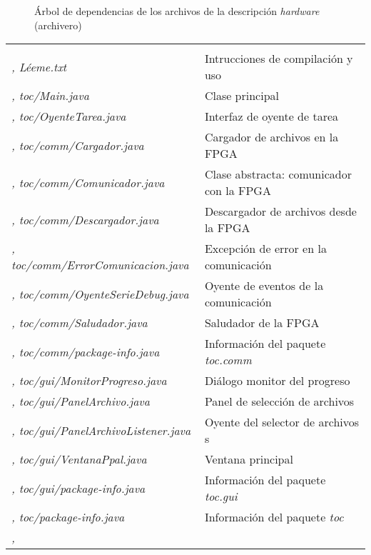 \documentclass{article}
\begin{document}
\begin{figure}[ht] \centering
{}
\caption{Árbol de dependencias de los archivos de la descripción {\itshape hardware} (archivero)}
\end{figure}

\begin{tabu}{| >{\itshape}X[3, l] | X[5, l] |}
	 \\ \sep
	Léeme.txt & Intrucciones de compilación y uso \\ \sep
	toc/Main.java & Clase principal \\ \sep
	toc/OyenteTarea.java & Interfaz de oyente de tarea \\ \sep
	toc/comm/Cargador.java & Cargador de archivos en la FPGA \\ \sep
	toc/comm/Comunicador.java & Clase abstracta: comunicador con la FPGA \\ \sep
	toc/comm/Descargador.java & Descargador de archivos desde la FPGA \\ \sep
	toc/comm/ErrorComunicacion.java & Excepción de error en la comunicación \\ \sep
	toc/comm/OyenteSerieDebug.java & Oyente de eventos de la comunicación \\ \sep
	toc/comm/Saludador.java & Saludador de la FPGA \\ \sep
	toc/comm/package-info.java & Información del paquete {\itshape toc.comm} \\ \sep
	toc/gui/MonitorProgreso.java & Diálogo monitor del progreso \\ \sep
	toc/gui/PanelArchivo.java & Panel de selección de archivos \\ \sep
	toc/gui/PanelArchivoListener.java & Oyente del selector de archivos s\\ \sep
	toc/gui/VentanaPpal.java & Ventana principal \\ \sep
	toc/gui/package-info.java & Información del paquete {\itshape toc.gui} \\ \sep
	toc/package-info.java & Información del paquete {\itshape toc} \\ \sep
\end{tabu}
\end{document}
